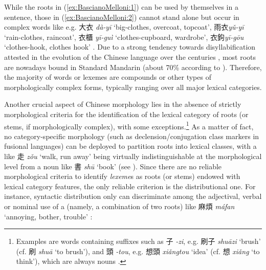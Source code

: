 \documentclass[output=paper]{langsci/langscibook}
\begin{document}
While the roots in (\ref{ex:BascianoMelloni:1}) can be used by themselves in a sentence, those in
(\ref{ex:BascianoMelloni:2}) cannot stand alone but occur in complex words like e.g. 大衣
\emph{dà-yī} `big-clothes, overcoat, topcoat', 雨衣\emph{yǔ-yī}
`rain-clothes, raincoat', 衣櫃 \emph{yī-guì} `clothes-cupboard,
wardrobe', 衣鉤\emph{yī-gōu} `clothes-hook, clothes hook' %
\citep[105-106]{ArcodiaBasciano2017}%
%
. Due to a strong tendency towards
disyllabification attested in the evolution of the Chinese language over
the centuries %
\citep[see][70-72]{Shi2002}%
%
, most roots are nowadays bound in
Standard Mandarin (about 70\% according to %
\citealt{Packard2000a}%
%
). Therefore, the
majority of words or lexemes are compounds or other types of
morphologically complex forms, typically ranging over all major lexical
categories.

Another crucial aspect of Chinese morphology lies in the absence of
strictly morphological criteria for the identification of the lexical
category of roots (or stems, if morphologically complex), with some
exceptions.\footnote{Examples are words containing suffixes such as 子
  \emph{-zi}, e.g. 刷子 \emph{shuāzi} `brush' (cf. 刷 \emph{shuā} `to
  brush'), and 頭 \emph{-tou}, e.g. 想頭 \emph{xiǎngtou} `idea' (cf. 想
  \emph{xiǎng} `to think'), which are always nouns %
\citep[see][]{Basciano2017}%
%
.}
As a matter of fact, no category-specific morphology (such as
declension/conjugation class markers in fusional languages) can be
deployed to partition roots into lexical classes, with a  like 走
\emph{zǒu} `walk, run away' being virtually indistinguishable at the
morphological level from a noun like 書 \emph{shū} `book' (see %
\citealt{Basciano2017}%
%
). Since there are no reliable morphological criteria to identify
\emph{lexeme}s as roots (or stems) endowed with lexical category
features, the only reliable criterion is the distributional one. For
instance, syntactic distribution only can discriminate among the
adjectival, verbal or nominal use of a  (namely, a combination of
two roots) like 麻煩 \emph{máfan} `annoying, bother, trouble' %
\citep[examples below from][561--562]{Basciano2017}%
%
:

\ea\label{ex:BascianoMelloni:3}
\end{document}
